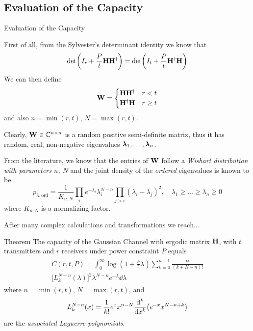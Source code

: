\subsection{Evaluation of the Capacity}
\begin{frame}[allowframebreaks]{Evaluation of the Capacity}

First of all, from the Sylvester's determinant identity we know that
$$\det(I_r + \frac{P}{t}\vb{H\ensuremath{H^\dagger}}) = \det(I_t + \frac{P}{t}\vb{\ensuremath{H^\dagger}H})$$
We can then define
\begin{equation*}
\vb{W}=\begin{cases}
\vb{H\ensuremath{H^\dagger}}	& r<t\\
\vb{\ensuremath{H^\dagger}H}	& r\geq t
\end{cases}
\end{equation*}
and also $n=\min(r,t)$, $N=\max(r,t)$.

\medskip
Clearly, $\vb{W}\in \mathbb{C}^{n\times n}$ is a random positive semi-definite matrix, thus it has random, real, non-negative eigenvalues $\vb*{\lambda}_1,\ldots,\vb*{\lambda}_n$.

\framebreak

From the literature, we know that the entries of $\vb{W}$ follow a \textit{Wishart distribution with parameters $n$, $N$} and the joint density of the \textit{ordered} eigenvalues is known to be \cite{james1964}
$$p_{\lambda,\text{ord}} = 	\frac{1}{K_{n,N}}
\prod_i e^{-\lambda_i}\lambda_i^{N-n}
\prod_{j>i} (\lambda_i-\lambda_j)^2,
\quad \lambda_1\geq \ldots \geq \lambda_n \geq 0 $$
where $K_{n,N}$ is a normalizing factor.

\medskip
After many complex calculations and transformations we reach...

\framebreak

\begin{alertblock}{Theorem}
	The capacity of the Gaussian Channel with ergodic matrix $\vb{H}$, with $t$ transmitters and $r$ receivers under power constraint $P$ equals
	\begin{align}\label{eq:capacity_ergodic}
	\begin{split}
	C(r,t,P) = \int_0^\infty \log(1+\frac{P}{t}\lambda)
	\sum_{k=0}^{n-1} \frac{k!}{(k+N-n)!}\\
	\Big[L_k^{N-n}(\lambda)\Big]^2
	\lambda^{N-n} e^{-\lambda}
	\dd{\lambda}
	\end{split}
	\end{align}
	where $n=\min(r,t)$, $N=\max(r,t)$, and
	$$L_k^{N-n}(x) = \frac{1}{k!}
	e^x x^{n-N}
	\dv[k]{}{x}
	\qty(e^{-x}x^{N-n+k})$$
	are the \textit{associated Laguerre polynomials}.
\end{alertblock}

\end{frame}

